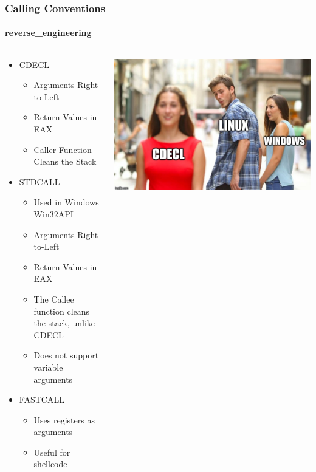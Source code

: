 \documentclass[aspectratio=169]{beamer}
\begin{document}
\begin{frame}
  \frametitle{Calling Conventions}
  \framesubtitle{reverse\_engineering}
  \begin{columns}
    \begin{column}{.5\textwidth}
      \begin{itemize}
      \item{CDECL}
        \begin{itemize}
        \item{Arguments Right-to-Left}
        \item{Return Values in EAX}
        \item{Caller Function Cleans the Stack}
        \end{itemize}
      \item{STDCALL}
        \begin{itemize}
        \item{Used in Windows Win32API}
        \item{Arguments Right-to-Left}
        \item{Return Values in EAX}
        \item{The Callee function cleans the stack, unlike CDECL}
        \item{Does not support variable arguments}
        \end{itemize}
      \item{FASTCALL}
        \begin{itemize}
        \item{Uses registers as arguments}
        \item{Useful for shellcode}
        \end{itemize}
      \end{itemize}
    \end{column}
    \hfill
    \begin{column}{.5\textwidth}
      \begin{center}
        \includegraphics[scale=0.27]{cdecl-meme}
      \end{center}
    \end{column}
  \end{columns}
\end{frame}
\end{document}

